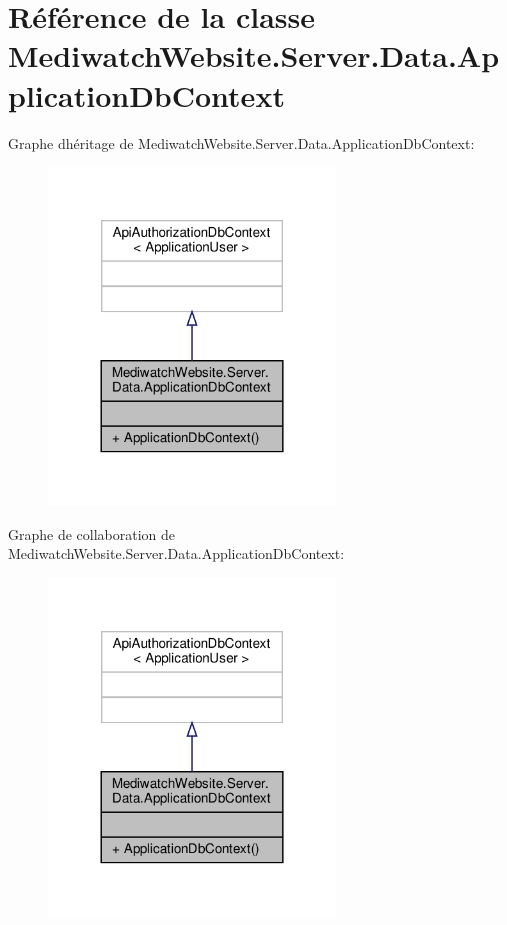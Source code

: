 \hypertarget{class_mediwatch_website_1_1_server_1_1_data_1_1_application_db_context}{}\section{Référence de la classe Mediwatch\+Website.\+Server.\+Data.\+Application\+Db\+Context}
\label{class_mediwatch_website_1_1_server_1_1_data_1_1_application_db_context}


Graphe d\textquotesingle{}héritage de Mediwatch\+Website.\+Server.\+Data.\+Application\+Db\+Context\+:\nopagebreak
\begin{figure}[H]
\begin{center}
\leavevmode
\includegraphics[width=216pt]{class_mediwatch_website_1_1_server_1_1_data_1_1_application_db_context__inherit__graph}
\end{center}
\end{figure}


Graphe de collaboration de Mediwatch\+Website.\+Server.\+Data.\+Application\+Db\+Context\+:\nopagebreak
\begin{figure}[H]
\begin{center}
\leavevmode
\includegraphics[width=216pt]{class_mediwatch_website_1_1_server_1_1_data_1_1_application_db_context__coll__graph}
\end{center}
\end{figure}

